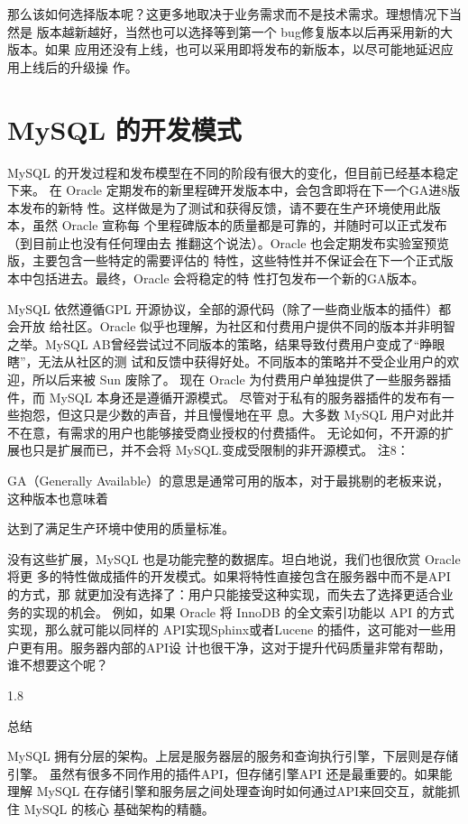 那么该如何选择版本呢？这更多地取决于业务需求而不是技术需求。理想情况下当然是
版本越新越好，当然也可以选择等到第一个 bug修复版本以后再采用新的大版本。如果
应用还没有上线，也可以采用即将发布的新版本，以尽可能地延迟应用上线后的升级操
作。

\section{MySQL 的开发模式}
MySQL 的开发过程和发布模型在不同的阶段有很大的变化，但目前已经基本稳定下来。
在 Oracle 定期发布的新里程碑开发版本中，会包含即将在下一个GA进8版本发布的新特
性。这样做是为了测试和获得反馈，请不要在生产环境使用此版本，虽然 Oracle 宣称每
个里程碑版本的质量都是可靠的，并随时可以正式发布（到目前止也没有任何理由去
推翻这个说法）。Oracle 也会定期发布实验室预览版，主要包含一些特定的需要评估的
特性，这些特性并不保证会在下一个正式版本中包括进去。最终，Oracle 会将稳定的特
性打包发布一个新的GA版本。

MySQL 依然遵循GPL 开源协议，全部的源代码（除了一些商业版本的插件）都会开放
给社区。Oracle 似乎也理解，为社区和付费用户提供不同的版本并非明智之举。MySQL
AB曾经尝试过不同版本的策略，结果导致付费用户变成了“睁眼瞎”，无法从社区的测
试和反馈中获得好处。不同版本的策略并不受企业用户的欢迎，所以后来被 Sun 废除了。
现在 Oracle 为付费用户单独提供了一些服务器插件，而 MySQL 本身还是遵循开源模式。
尽管对于私有的服务器插件的发布有一些抱怨，但这只是少数的声音，并且慢慢地在平
息。大多数 MySQL 用户对此并不在意，有需求的用户也能够接受商业授权的付费插件。
无论如何，不开源的扩展也只是扩展而已，并不会将 MySQL.变成受限制的非开源模式。
注8：

GA（Generally Available）的意思是通常可用的版本，对于最挑剔的老板来说，这种版本也意味着

达到了满足生产环境中使用的质量标准。

没有这些扩展，MySQL 也是功能完整的数据库。坦白地说，我们也很欣赏 Oracle 将更
多的特性做成插件的开发模式。如果将特性直接包含在服务器中而不是API的方式，那
就更加没有选择了：用户只能接受这种实现，而失去了选择更适合业务的实现的机会。
例如，如果 Oracle 将 InnoDB 的全文索引功能以 API 的方式实现，那么就可能以同样的
API实现Sphinx或者Lucene 的插件，这可能对一些用户更有用。服务器内部的API设
计也很干净，这对于提升代码质量非常有帮助，谁不想要这个呢？

1.8

总结

MySQL 拥有分层的架构。上层是服务器层的服务和查询执行引擎，下层则是存储引擎。
虽然有很多不同作用的插件API，但存储引擎API 还是最重要的。如果能理解 MySQL
在存储引擎和服务层之间处理查询时如何通过API来回交互，就能抓住 MySQL 的核心
基础架构的精髓。


